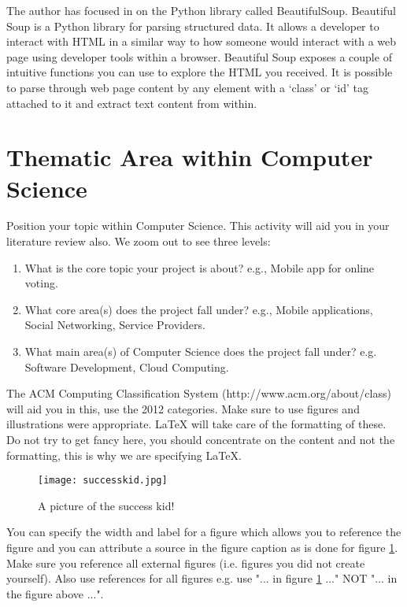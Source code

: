 The author has focused in on the Python library called BeautifulSoup. Beautiful Soup is a Python library for parsing structured data. It allows a developer to interact with HTML in a similar way to how someone would interact with a web page using developer tools within a browser. Beautiful Soup exposes a couple of intuitive functions you can use to explore the HTML you received. It is possible to parse through web page content by any element with a ‘class’ or ‘id’ tag attached to it and extract text content from within.


\section{Thematic Area within Computer Science}
Position your topic within Computer Science. This activity will aid you in your literature review also. We zoom out to see three levels: \cite{Barricelli2019}

\begin{enumerate}
    \item What is the core topic your project is about? e.g., Mobile app for online voting.
    \item What core area(s) does the project fall under? e.g., Mobile applications, Social Networking, Service Providers. 
    \item What main area(s) of Computer Science does the project fall under? e.g. Software Development, Cloud Computing.
\end{enumerate}

The ACM Computing Classification System (http://www.acm.org/about/class) will aid you in this, use the 2012 categories. Make sure to use figures and illustrations were appropriate. LaTeX will take care of the formatting of these. Do not try to get fancy here, you should concentrate on the content and not the formatting, this is why we are specifying LaTeX.

\begin{figure}[ht]
  \centering
      \texttt{[image: successkid.jpg]}
  \caption[A picture of the success kid!]{A picture of the success kid!\cite{Reference1}}
  \label{fig:successkid}
\end{figure}

You can specify the width and label for a figure which allows you to reference the figure and you can attribute a source in the figure caption as is done for figure \ref{fig:successkid}. Make sure you reference all external figures (i.e. figures you did not create yourself). Also use references for all figures e.g. use "... in figure \ref{fig:successkid} ..." NOT "... in the figure above ...".

